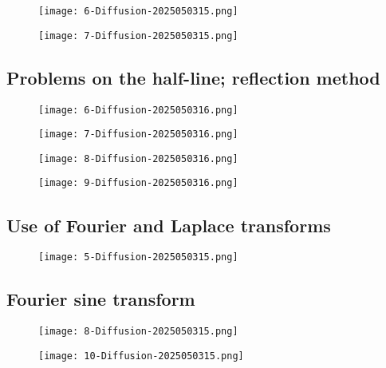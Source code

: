 \begin{figure}[H]
\centering
\texttt{[image: 6-Diffusion-2025050315.png]}
\label{}
\end{figure}
\begin{figure}[H]
\centering
\texttt{[image: 7-Diffusion-2025050315.png]}
\label{}
\end{figure}

\subsection{Problems on the half-line; reflection method}

\begin{figure}[H]
\centering
\texttt{[image: 6-Diffusion-2025050316.png]}
\label{}
\end{figure}
\begin{figure}[H]
\centering
\texttt{[image: 7-Diffusion-2025050316.png]}
\label{}
\end{figure}
\begin{figure}[H]
\centering
\texttt{[image: 8-Diffusion-2025050316.png]}
\label{}
\end{figure}
\begin{figure}[H]
\centering
\texttt{[image: 9-Diffusion-2025050316.png]}
\label{}
\end{figure}

\subsection{Use of Fourier and Laplace transforms}

\begin{figure}[H]
\centering
\texttt{[image: 5-Diffusion-2025050315.png]}
\label{}
\end{figure}

\subsection{Fourier sine transform}

\begin{figure}[H]
\centering
\texttt{[image: 8-Diffusion-2025050315.png]}
\label{}
\end{figure}
\begin{figure}[H]
\centering
\texttt{[image: 10-Diffusion-2025050315.png]}
\label{}
\end{figure}

